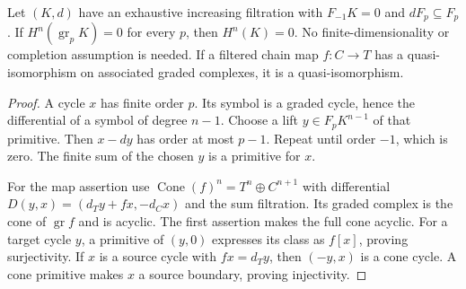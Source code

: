\begin{theorem}\label{thm:fl19-filtered-acyclicity}
Let $(K,d)$ have an exhaustive increasing filtration with $F_{-1}K=0$ and $dF_p\subseteq F_p$.
If $H^n(\operatorname{gr}_pK)=0$ for every $p$, then $H^n(K)=0$.
No finite-dimensionality or completion assumption is needed.
If a filtered chain map $f:C\to T$ has a quasi-isomorphism on associated graded complexes, it is a quasi-isomorphism.
\end{theorem}
\begin{proof}
A cycle $x$ has finite order $p$.
Its symbol is a graded cycle, hence the differential of a symbol of degree $n-1$.
Choose a lift $y\in F_pK^{n-1}$ of that primitive.
Then $x-dy$ has order at most $p-1$.
Repeat until order $-1$, which is zero.
The finite sum of the chosen $y$ is a primitive for $x$.

For the map assertion use
$\operatorname{Cone}(f)^n=T^n\oplus C^{n+1}$ with differential
$D(y,x)=(d_Ty+fx,-d_Cx)$ and the sum filtration.
Its graded complex is the cone of $\operatorname{gr}f$ and is acyclic.
The first assertion makes the full cone acyclic.
For a target cycle $y$, a primitive of $(y,0)$ expresses its class as $f[x]$, proving surjectivity.
If $x$ is a source cycle with $fx=d_Ty$, then $(-y,x)$ is a cone cycle.
A cone primitive makes $x$ a source boundary, proving injectivity.
\end{proof}

